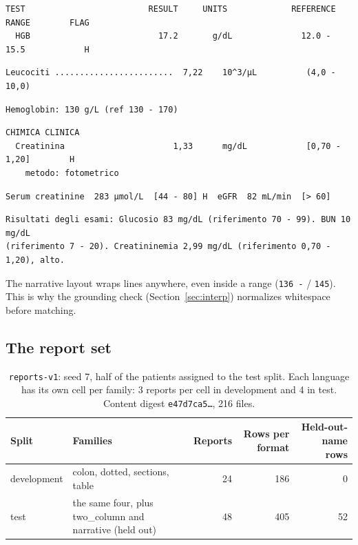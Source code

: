 \documentclass[11pt,a4paper]{article}
\begin{document}
\begin{Verbatim}[label={\scriptsize table (en-US)}]
  TEST                         RESULT     UNITS             REFERENCE RANGE        FLAG
  HGB                          17.2       g/dL              12.0 - 15.5            H
\end{Verbatim}
\begin{Verbatim}[label={\scriptsize dotted (it)}]
  Leucociti ........................  7,22    10^3/µL          (4,0 - 10,0)
\end{Verbatim}
\begin{Verbatim}[label={\scriptsize colon (en-GB)}]
Hemoglobin: 130 g/L (ref 130 - 170)
\end{Verbatim}
\begin{Verbatim}[label={\scriptsize sections (it)}]
CHIMICA CLINICA
  Creatinina                      1,33      mg/dL            [0,70 - 1,20]        H
    metodo: fotometrico
\end{Verbatim}
\begin{Verbatim}[label={\scriptsize two\_column (en-GB), held out}]
  Serum creatinine  283 µmol/L  [44 - 80] H  eGFR  82 mL/min  [> 60]
\end{Verbatim}
\begin{Verbatim}[label={\scriptsize narrative (it), held out}]
Risultati degli esami: Glucosio 83 mg/dL (riferimento 70 - 99). BUN 10 mg/dL
(riferimento 7 - 20). Creatininemia 2,99 mg/dL (riferimento 0,70 - 1,20), alto.
\end{Verbatim}

The narrative layout wraps lines anywhere, even inside a range (\texttt{136 -} / \texttt{145}). This is why the grounding check (Section~\ref{sec:interp}) normalizes whitespace before matching.

\subsection{The report set}
\begin{table}[h]
\centering\small
\begin{tabularx}{\linewidth}{@{}l>{\raggedright\arraybackslash}Xrrr@{}}
\toprule
Split & Families & Reports & Rows per format & Held-out-name rows \\
\midrule
development & colon, dotted, sections, table & 24 & 186 & 0 \\
test & the same four, plus two\_column and narrative (held out) & 48 & 405 & 52 \\
\bottomrule
\end{tabularx}
\caption{\texttt{reports-v1}: seed 7, half of the patients assigned to the test split. Each language has its own cell per family: 3 reports per cell in development and 4 in test. Content digest \texttt{e47d7ca5\ldots}, 216 files.}
\label{tab:reports}
\end{table}
\end{document}
